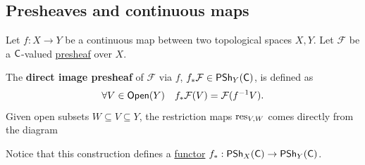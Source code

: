 \documentclass[../../../main]{subfiles}
\begin{document}
\subsection{Presheaves and continuous maps} \label{ssec:presheaves-and-continuous-maps}
\begin{definition} \label{def:direct-image-presheaf}
  Let \(f: X \to Y\) be a continuous map between two topological spaces \(X, Y\).
  Let \(\mathcal{F}\) be a \(\mathsf{C}\)-valued \hyperref[def:presheaf]{presheaf} over \(X\).

  The \textbf{direct image presheaf} of \(\mathcal{F}\) via \(f\), \(f_{\ast}\mathcal{F} \in \mathsf{PSh}_{Y}(\mathsf{C})\), is defined as
  \begin{equation*}
    \forall V \in \mathsf{Open}(Y) \quad f_{\ast}\mathcal{F}(V) = \mathcal{F}(f^{-1}V).
  \end{equation*}
  Given open subsets \(W \subseteq V \subseteq Y\), the restriction maps \(\operatorname{res}_{V, W}\) comes directly from the diagram
  \begin{center}
  \end{center}

  Notice that this construction defines a \hyperref[def:functor]{functor} \(f_{\ast}: \mathsf{PSh}_{X}(\mathsf{C}) \to \mathsf{PSh}_{Y}(\mathsf{C})\).
\end{definition}
\end{document}
